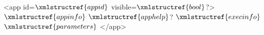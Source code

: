 <app id=$\xmlstructref{appid}$ visible=$\xmlstructref{bool}$?>
  $\xmlstructref{appinfo}$
  $\xmlstructref{apphelp}$?
  $\xmlstructref{execinfo}$
  $\xmlstructref{parameters}$
</app>
